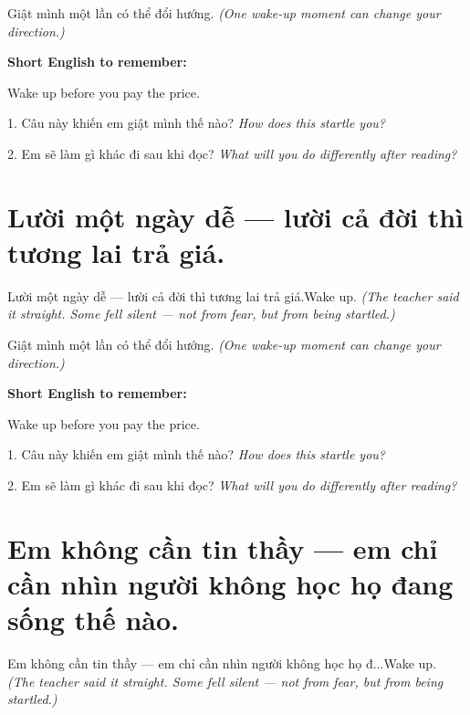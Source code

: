 \begin{baihoc}
Giật mình một lần có thể đổi hướng.
\textit{(One wake-up moment can change your direction.)}
\end{baihoc}

\begin{ghinhoanh}
\textbf{Short English to remember:}

Wake up before you pay the price.

\end{ghinhoanh}

\begin{tuhocnhanh}
1. Câu này khiến em giật mình thế nào? \textit{How does this startle you?}

2. Em sẽ làm gì khác đi sau khi đọc? \textit{What will you do differently after reading?}
\end{tuhocnhanh}
\ngancach


\section{Lười một ngày dễ — lười cả đời thì tương lai trả giá.}
\begin{truyen}{Lười một ngày dễ — lười cả đời thì tương lai trả giá.}{Wake up.}
\textit{(The teacher said it straight. Some fell silent — not from fear, but from being startled.)}
\end{truyen}

\begin{baihoc}
Giật mình một lần có thể đổi hướng.
\textit{(One wake-up moment can change your direction.)}
\end{baihoc}

\begin{ghinhoanh}
\textbf{Short English to remember:}

Wake up before you pay the price.

\end{ghinhoanh}

\begin{tuhocnhanh}
1. Câu này khiến em giật mình thế nào? \textit{How does this startle you?}

2. Em sẽ làm gì khác đi sau khi đọc? \textit{What will you do differently after reading?}
\end{tuhocnhanh}
\ngancach


\section{Em không cần tin thầy — em chỉ cần nhìn người không học họ đang sống thế nào.}
\begin{truyen}{Em không cần tin thầy — em chỉ cần nhìn người không học họ đ...}{Wake up.}
\textit{(The teacher said it straight. Some fell silent — not from fear, but from being startled.)}
\end{truyen}

